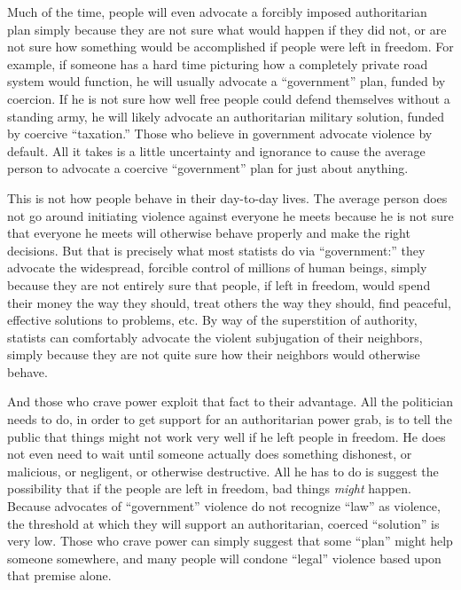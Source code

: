 \documentclass{book}
\begin{document}
Much of the time, people will even advocate a forcibly imposed authoritarian plan simply because they are not sure what would happen if they did not, or are not sure how something would be accomplished if people were left in freedom. For example, if someone has a hard time picturing how a completely private road system would function, he will usually advocate a \enquote{government} plan, funded by coercion. If he is not sure how well free people could defend themselves without a standing army, he will likely advocate an authoritarian military solution, funded by coercive \enquote{taxation.} Those who believe in government advocate violence by default. All it takes is a little uncertainty and ignorance to cause the average person to advocate a coercive \enquote{government} plan for just about anything.

This is not how people behave in their day-to-day lives. The average person does not go around initiating violence against everyone he meets because he is not sure that everyone he meets will otherwise behave properly and make the right decisions. But that is precisely what most statists do via \enquote{government:} they advocate the widespread, forcible control of millions of human beings, simply because they are not entirely sure that people, if left in freedom, would spend their money the way they should, treat others the way they should, find peaceful, effective solutions to problems, etc. By way of the superstition of authority, statists can comfortably advocate the violent subjugation of their neighbors, simply because they are not quite sure how their neighbors would otherwise behave.

And those who crave power exploit that fact to their advantage. All the politician needs to do, in order to get support for an authoritarian power grab, is to tell the public that things might not work very well if he left people in freedom. He does not even need to wait until someone actually does something dishonest, or malicious, or negligent, or otherwise destructive. All he has to do is suggest the possibility that if the people are left in freedom, bad things \emph{might} happen. Because advocates of \enquote{government} violence do not recognize \enquote{law} as violence, the threshold at which they will support an authoritarian, coerced \enquote{solution} is very low. Those who crave power can simply suggest that some \enquote{plan} might help someone somewhere, and many people will condone \enquote{legal} violence based upon that premise alone.
\end{document}
